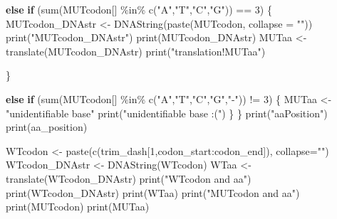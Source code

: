 \documentclass[
]{article}
\newenvironment{Shaded}{\begin{snugshade}}{\end{snugshade}}
\newcommand{\AttributeTok}[1]{\textcolor[rgb]{0.77,0.63,0.00}{#1}}
\newcommand{\ControlFlowTok}[1]{\textcolor[rgb]{0.13,0.29,0.53}{\textbf{#1}}}
\newcommand{\DecValTok}[1]{\textcolor[rgb]{0.00,0.00,0.81}{#1}}
\newcommand{\FunctionTok}[1]{\textcolor[rgb]{0.00,0.00,0.00}{#1}}
\newcommand{\NormalTok}[1]{#1}
\newcommand{\OtherTok}[1]{\textcolor[rgb]{0.56,0.35,0.01}{#1}}
\newcommand{\SpecialCharTok}[1]{\textcolor[rgb]{0.00,0.00,0.00}{#1}}
\newcommand{\StringTok}[1]{\textcolor[rgb]{0.31,0.60,0.02}{#1}}
\begin{document}
\begin{Shaded}
\begin{Highlighting}[]
        \ControlFlowTok{else} \ControlFlowTok{if}\NormalTok{ (}\FunctionTok{sum}\NormalTok{(MUTcodon[] }\SpecialCharTok{\%in\%} \FunctionTok{c}\NormalTok{(}\StringTok{"A"}\NormalTok{,}\StringTok{"T"}\NormalTok{,}\StringTok{"C"}\NormalTok{,}\StringTok{"G"}\NormalTok{)) }\SpecialCharTok{==} \DecValTok{3}\NormalTok{)}
\NormalTok{        \{}
\NormalTok{          MUTcodon\_DNAstr }\OtherTok{\textless{}{-}} \FunctionTok{DNAString}\NormalTok{(}\FunctionTok{paste}\NormalTok{(MUTcodon, }\AttributeTok{collapse =} \StringTok{""}\NormalTok{))}
          \FunctionTok{print}\NormalTok{(}\StringTok{"MUTcodon\_DNAstr"}\NormalTok{)}
          \FunctionTok{print}\NormalTok{(MUTcodon\_DNAstr)}
\NormalTok{          MUTaa }\OtherTok{\textless{}{-}} \FunctionTok{translate}\NormalTok{(MUTcodon\_DNAstr)}
          \FunctionTok{print}\NormalTok{(}\StringTok{"translation!MUTaa"}\NormalTok{)}
          
\NormalTok{        \}}
        
        \ControlFlowTok{else} \ControlFlowTok{if}\NormalTok{ (}\FunctionTok{sum}\NormalTok{(MUTcodon[] }\SpecialCharTok{\%in\%} \FunctionTok{c}\NormalTok{(}\StringTok{"A"}\NormalTok{,}\StringTok{"T"}\NormalTok{,}\StringTok{"C"}\NormalTok{,}\StringTok{"G"}\NormalTok{,}\StringTok{"{-}"}\NormalTok{)) }\SpecialCharTok{!=} \DecValTok{3}\NormalTok{)}
\NormalTok{        \{}
\NormalTok{          MUTaa }\OtherTok{\textless{}{-}} \StringTok{"unidentifiable base"}
          \FunctionTok{print}\NormalTok{(}\StringTok{"unidentifiable base :("}\NormalTok{)}
\NormalTok{        \}}
\NormalTok{      \}}
      \FunctionTok{print}\NormalTok{(}\StringTok{"aaPosition"}\NormalTok{)}
      \FunctionTok{print}\NormalTok{(aa\_position)}
      
\NormalTok{      WTcodon }\OtherTok{\textless{}{-}} \FunctionTok{paste}\NormalTok{(}\FunctionTok{c}\NormalTok{(trim\_dash[}\DecValTok{1}\NormalTok{,codon\_start}\SpecialCharTok{:}\NormalTok{codon\_end]), }\AttributeTok{collapse=}\StringTok{""}\NormalTok{)}
\NormalTok{      WTcodon\_DNAstr }\OtherTok{\textless{}{-}} \FunctionTok{DNAString}\NormalTok{(WTcodon)}
\NormalTok{      WTaa }\OtherTok{\textless{}{-}} \FunctionTok{translate}\NormalTok{(WTcodon\_DNAstr)}
      \FunctionTok{print}\NormalTok{(}\StringTok{"WTcodon and aa"}\NormalTok{)}
      \FunctionTok{print}\NormalTok{(WTcodon\_DNAstr)}
      \FunctionTok{print}\NormalTok{(WTaa)}
      \FunctionTok{print}\NormalTok{(}\StringTok{"MUTcodon and aa"}\NormalTok{)}
      \FunctionTok{print}\NormalTok{(MUTcodon)}
      \FunctionTok{print}\NormalTok{(MUTaa)}
      

\end{Highlighting}
\end{Shaded}
\end{document}
